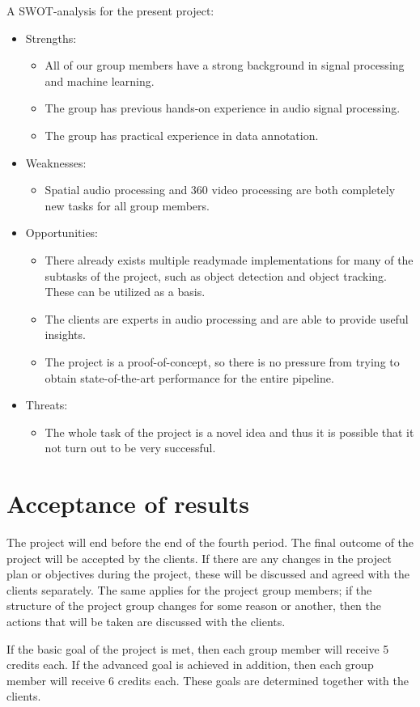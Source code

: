 A SWOT-analysis for the present project:
\begin{itemize}
    \item Strengths:
    \begin{itemize}
        \item All of our group members have a strong background in signal processing and machine learning.
        \item The group has previous hands-on experience in audio signal processing.
        \item The group has practical experience in data annotation.
    \end{itemize}
    \item Weaknesses:
    \begin{itemize}
        \item Spatial audio processing and 360 video processing are both completely new tasks for all group
        members.
    \end{itemize}
    \item Opportunities:
    \begin{itemize}
        \item There already exists multiple readymade implementations for many of the subtasks of the project,
        such as object detection and object tracking. These can be utilized as a basis.
        \item The clients are experts in audio processing and are able to provide useful insights.
        \item The project is a proof-of-concept, so there is no pressure from trying to obtain state-of-the-art
        performance for the entire pipeline.
    \end{itemize}
    \item Threats:
    \begin{itemize}
        \item The whole task of the project is a novel idea and thus it is possible that it not turn out to be
        very successful.
    \end{itemize}
\end{itemize}


\section{Acceptance of results}

The project will end before the end of the fourth period. The final outcome of the project will be accepted by the
clients. If there are any changes in the project plan or objectives during the project, these will be discussed
and agreed with the clients separately. The same applies for the project group members; if the structure of the
project group changes for some reason or another, then the actions that will be taken are discussed with the
clients.

If the basic goal of the project is met, then each group member will receive 5 credits each. If the advanced goal
is achieved in addition, then each group member will receive 6 credits each. These goals are determined together
with the clients.
